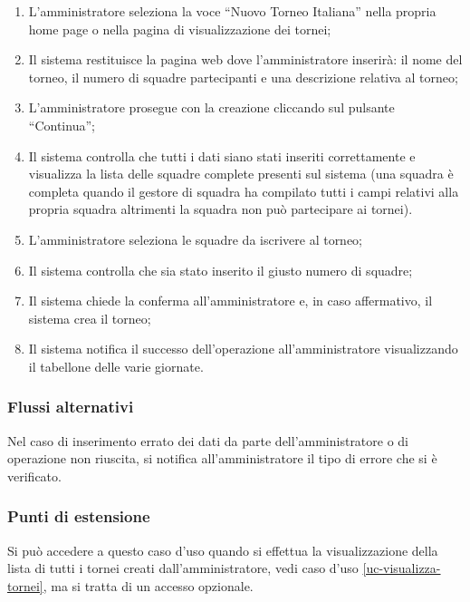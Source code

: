 \begin{enumerate}
	
	\item
	L'amministratore seleziona la voce ``Nuovo Torneo Italiana'' nella propria home page o nella pagina di visualizzazione dei tornei;
	
	\item
	Il sistema restituisce la pagina web dove l'amministratore inserirà: il nome del torneo, il numero di squadre partecipanti e una descrizione relativa al torneo;
	
	\item
	L'amministratore prosegue con la creazione cliccando sul pulsante ``Continua'';
	
	\item
	Il sistema controlla che tutti i dati siano stati inseriti correttamente e visualizza la lista delle squadre complete presenti sul sistema (una squadra è completa quando il gestore di squadra ha compilato tutti i campi relativi alla propria squadra altrimenti la squadra non può partecipare ai tornei).
	
	\item
	L'amministratore seleziona le squadre da iscrivere al torneo;
	
	\item
	Il sistema controlla che sia stato inserito il giusto numero di squadre;
	
	\item
	Il sistema chiede la conferma all'amministratore e, in caso affermativo, il sistema crea il torneo;
	
	\item
	Il sistema notifica il successo dell'operazione all'amministratore visualizzando il tabellone delle varie giornate.
	
\end{enumerate}

\subsubsection*{Flussi alternativi}
Nel caso di inserimento errato dei dati da parte dell'amministratore o di operazione non riuscita, si notifica all'amministratore il tipo di errore che si è verificato.

\subsubsection*{Punti di estensione}
Si può accedere a questo caso d'uso quando si effettua la visualizzazione della lista di tutti i tornei creati dall'amministratore, vedi caso d'uso \vref{uc-visualizza-tornei}, ma si tratta di un accesso opzionale.

